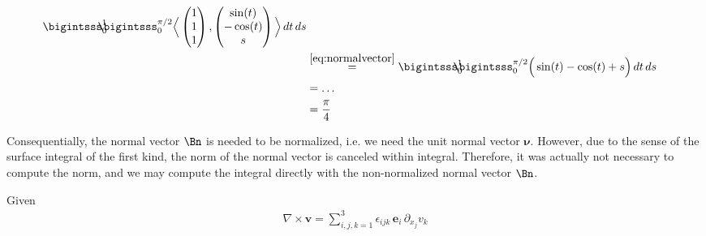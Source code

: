 \documentclass[12pt]{article}
\begin{document}
\begin{enumerate}[(i)]
\begin{align}
		      \bigintsss_{0}^{1} \!\!\!\!\! \bigintsss_{0}^{\pi/2}
		      \Big\langle \begin{pmatrix} 1\\1\\1\end{pmatrix}, 
		      \begin{pmatrix} \sin(t) \\ -\cos(t) \\  s \end{pmatrix}
		      \Big\rangle  \, dt \,ds                                                                          \\
		       & 
		      \stackrel{\eqref{eq:normalvector}}{=}
		      \bigintsss_{0}^{1} \!\!\!\!\! \bigintsss_{0}^{\pi/2}
		      \Big( \sin(t) - \cos(t) + s \Big)
		      \, dt \,ds                                                                                       \\
		       & = \dots                                                                                       \\
		       & = \frac{\pi}{4}
	      \end{align}
	      
	      Consequentially, the normal vector $\Bn$ is needed to be normalized, i.e. 
	      we need the unit normal vector $\bm{\nu}$.
	      However, due to the sense of the surface integral of the first kind,
	      the norm of the normal vector is canceled within integral.
	      Therefore, it was actually not necessary to compute the norm, 
	      and we may compute the integral directly with the non-normalized normal vector $\Bn$.
\end{enumerate}

\clearpage
Given 
\begin{align}
	\nabla\times\bm{v} = \sum\limits_{i,j,k=1}^3 \epsilon_{ijk}\, \bm{e}_i \, \partial_{x_j}v_k
\end{align}
\end{document}

